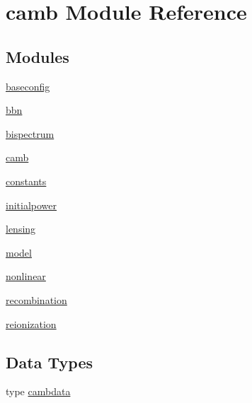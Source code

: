 \hypertarget{namespacecamb}{}\section{camb Module Reference}
\label{namespacecamb}
\subsection*{Modules}
\begin{DoxyCompactItemize}
\item 
 \mbox{\hyperlink{namespacecamb_1_1baseconfig}{baseconfig}}
\item 
 \mbox{\hyperlink{namespacecamb_1_1bbn}{bbn}}
\item 
 \mbox{\hyperlink{namespacecamb_1_1bispectrum}{bispectrum}}
\item 
 \mbox{\hyperlink{namespacecamb_1_1camb}{camb}}
\item 
 \mbox{\hyperlink{namespacecamb_1_1constants}{constants}}
\item 
 \mbox{\hyperlink{namespacecamb_1_1initialpower}{initialpower}}
\item 
 \mbox{\hyperlink{namespacecamb_1_1lensing}{lensing}}
\item 
 \mbox{\hyperlink{namespacecamb_1_1model}{model}}
\item 
 \mbox{\hyperlink{namespacecamb_1_1nonlinear}{nonlinear}}
\item 
 \mbox{\hyperlink{namespacecamb_1_1recombination}{recombination}}
\item 
 \mbox{\hyperlink{namespacecamb_1_1reionization}{reionization}}
\end{DoxyCompactItemize}
\subsection*{Data Types}
\begin{DoxyCompactItemize}
\item 
type \mbox{\hyperlink{structcamb_1_1cambdata}{cambdata}}
\end{DoxyCompactItemize}
